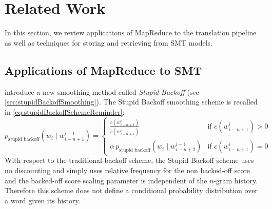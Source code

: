 \section{Related Work}
\label{sec:relatedwork}

In this section, we review applications of MapReduce to
the translation pipeline as well as techniques for storing
and retrieving from SMT models.

\subsection{Applications of MapReduce to SMT}
\label{sec:applicationsMapReduceSMT}

\citet{brants-popat-xu-och-dean:2007:EMNLP-CoNLL}
introduce a new smoothing method called
\emph{Stupid Backoff} (see \autoref{sec:stupidBackoffSmoothing}).
The Stupid Backoff smoothing scheme is recalled in \autoref{eq:stupidBackoffSchemeReminder}:
%
\begin{equation}
  p_{\text{stupid backoff}}(w_i \mid w_{i - n + 1}^{i - 1}) =
  \begin{cases}
    \frac{c(w_{i - n + 1}^i)}{c(w_{i - n + 1}^{i - 1})} & \text{if } c(w_{i - n + 1}^i) > 0 \\
    \alpha \, p_{\text{stupid backoff}}(w_i \mid w_{i - n + 2}^{i - 1}) & \text{if } c(w_{i - n + 1}^i) = 0
  \end{cases}
  \label{eq:stupidBackoffSchemeReminder}
\end{equation}
%
With respect to the traditional backoff scheme, the Stupid Backoff
scheme uses no discounting and simply uses relative frequency
for the non backed-off score and the backed-off score
scaling parameter is independent of
the $n$-gram history.
Therefore this scheme does not define a conditional probability
distribution %
over a word given its history.


